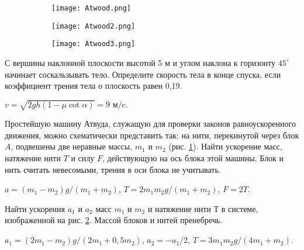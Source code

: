 \begin{figure}[h]
\centering
\begin{subfigure}[t]{.3\textwidth}
  \centering
  \texttt{[image: Atwood.png]}
  \caption{}
  \label{Atwood}
\end{subfigure}
\begin{subfigure}[t]{.3\textwidth}
  \centering
  \texttt{[image: Atwood2.png]}
  \caption{}
  \label{Atwood2}
\end{subfigure}
\begin{subfigure}[t]{.3\textwidth}
  \centering
  \texttt{[image: Atwood3.png]}
  \caption{}
  \label{Atwood3}
\end{subfigure}
\caption{}
\end{figure}

\begin{ex}
С вершины наклонной плоскости высотой 5 м и углом наклона к горизонту $45^{\circ}$ начинает соскальзывать тело. Определите скорость тела в конце спуска, если коэффициент трения тела  о плоскость равен 0,19.
\begin{ans}
$ v = \sqrt{2gh(1 - \mu \cot \alpha)} = 9 \textrm{ м/c}.$
\end{ans}
\end{ex}

\begin{ex} %
Простейшую машину Атвуда, служащую для проверки законов равноускоренного движения, можно схематически представить так: на нити, перекинутой через блок $A$, подвешены две неравные массы, $m_1$
и $m_2$ (рис. \ref{Atwood}). Найти ускорение масс, натяжение нити $T$ и силу $F$, действующую на ось блока этой машины. Блок и нить считать невесомыми, трения в оси блока не учитывать.
\begin{ans}
$a = (m_1 - m_2)g / (m_1 + m_2)$, $T = 2 m_1 m_2 g /(m_1 + m_2)$, $F = 2T$.
\end{ans}
\end{ex}

\begin{ex} %
Найти ускорения $a_1$ и $a_2$ масс $m_1$ и $m_2$ и натяжение нити $Т$ в системе, изображенной на рис. \ref{Atwood2}. Массой блоков и нитей пренебречь.
\begin{ans}
$a_1 = (2m_1-m_2)g/(2m_1+0,5m_2)$, $a_2 = -a_1/2$, $T=3m_1 m_2g/(4m_1 + m_2)$.
\end{ans}
\end{ex}

\complexProblems

